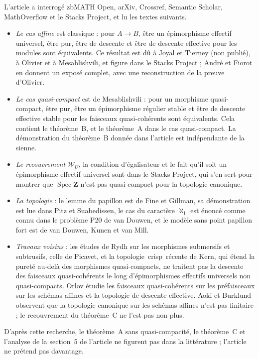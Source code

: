 \documentclass[11pt,a4paper]{amsart}
\theoremstyle{definition}
\theoremstyle{plain}
\theoremstyle{remark}
\newcommand{\Z}{\mathbf Z}
\newcommand{\Spec}{\operatorname{Spec}}
\begin{document}
L'article a interrogé zbMATH Open, arXiv, Crossref, Semantic Scholar, MathOverflow et le Stacks Project, et lu les textes suivants.

\begin{itemize}
\item \emph{Le cas affine} est classique : pour $A\to B$, être un épimorphisme effectif universel, être pur, être de descente et être de descente effective pour les modules sont équivalents. Ce résultat est dû à Joyal et Tierney (non publié), à Olivier et à Mesablishvili, et figure dans le Stacks Project ; André et Fiorot en donnent un exposé complet, avec une reconstruction de la preuve d'Olivier.
\item \emph{Le cas quasi-compact} est de Mesablishvili : pour un morphisme quasi-compact, être pur, être un épimorphisme régulier stable et être de descente effective stable pour les faisceaux quasi-cohérents sont équivalents. Cela contient le théorème~B, et le théorème~A dans le cas quasi-compact. La démonstration du théorème~B donnée dans l'article est indépendante de la sienne.
\item \emph{Le recouvrement} $\mathcal W_U$, la condition d'égalisateur et le fait qu'il soit un épimorphisme effectif universel sont dans le Stacks Project, qui s'en sert pour montrer que $\Spec\Z$ n'est pas quasi-compact pour la topologie canonique.
\item \emph{La topologie} : le lemme du papillon est de Fine et Gillman, sa démonstration est lue dans Pitz et Suabedissen, le cas du caractère $\aleph_1$ est énoncé comme connu dans le problème P20 de van Douwen, et le modèle sans point papillon fort est de van Douwen, Kunen et van Mill.
\item \emph{Travaux voisins} : les études de Rydh sur les morphismes submersifs et subtrusifs, celle de Picavet, et la topologie \guillemotleft\,crisp\,\guillemotright{} récente de Kern, qui étend la pureté au-delà des morphismes quasi-compacts, ne traitent pas la descente des faisceaux quasi-cohérents le long d'épimorphismes effectifs universels non quasi-compacts. Orlov étudie les faisceaux quasi-cohérents sur les préfaisceaux sur les schémas affines et la topologie de descente effective. Aoki et Burklund observent que la topologie canonique sur les schémas affines n'est pas finitaire ; le recouvrement du théorème~C ne l'est pas non plus.
\end{itemize}

D'après cette recherche, le théorème~A sans quasi-compacité, le théorème~C et l'analyse de la section~5 de l'article ne figurent pas dans la littérature ; l'article ne prétend pas davantage.
\end{document}
